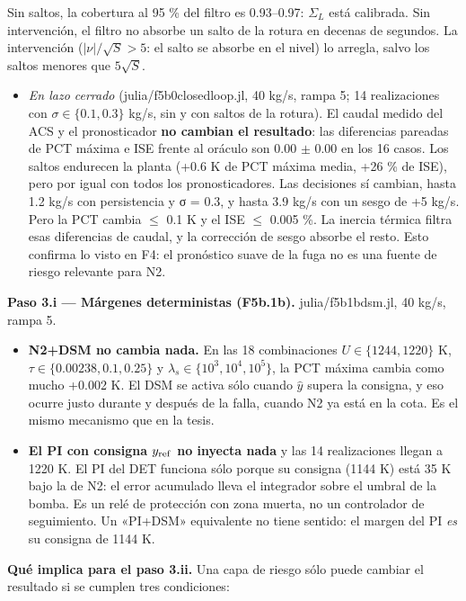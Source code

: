 \documentclass[11pt,a4paper]{article}
\newcommand{\codeus}{\textunderscore\allowbreak}
\newcommand{\code}[1]{{\small\ttfamily\let\_\codeus #1}}
\begin{document}
Sin saltos, la cobertura al 95 \% del filtro es 0.93–0.97: $\Sigma_L$ está calibrada. Sin intervención, el filtro no absorbe un salto de la rotura en decenas de segundos. La intervención ($|\nu|/\sqrt S>5$: el salto se absorbe en el nivel) lo arregla, salvo los saltos menores que $5\sqrt S$.

\begin{itemize}
\item \emph{En lazo cerrado} (\code{julia/f5b0\_closed\_loop.jl}, 40 kg/s, rampa 5; 14 realizaciones con $\sigma\in\{0.1, 0.3\}$ kg/s, sin y con saltos de la rotura). El caudal medido del ACS y el pronosticador \textbf{no cambian el resultado}: las diferencias pareadas de PCT máxima e ISE frente al oráculo son 0.00 $\pm$ 0.00 en los 16 casos. Los saltos endurecen la planta (+0.6 K de PCT máxima media, +26 \% de ISE), pero por igual con todos los pronosticadores. Las decisiones sí cambian, hasta 1.2 kg/s con persistencia y σ = 0.3, y hasta 3.9 kg/s con un sesgo de +5 kg/s. Pero la PCT cambia $\le$ 0.1 K y el ISE $\le$ 0.005 \%. La inercia térmica filtra esas diferencias de caudal, y la corrección de sesgo absorbe el resto. Esto confirma lo visto en F4: el pronóstico suave de la fuga no es una fuente de riesgo relevante para N2.
\end{itemize}

\textbf{Paso 3.i — Márgenes deterministas (F5b.1b).} \code{julia/f5b1b\_dsm.jl}, 40 kg/s, rampa 5.

\begin{itemize}
\item \textbf{N2+DSM no cambia nada.} En las 18 combinaciones $U\in\{1244,1220\}$ K, $\tau\in\{0.00238, 0.1, 0.25\}$ y $\lambda_s\in\{10^3,10^4,10^5\}$, la PCT máxima cambia como mucho +0.002 K. El DSM se activa sólo cuando $\hat y$ supera la consigna, y eso ocurre justo durante y después de la falla, cuando N2 ya está en la cota. Es el mismo mecanismo que en la tesis.
\item \textbf{El PI con consigna $y_{\rm ref}$ no inyecta nada} y las 14 realizaciones llegan a 1220 K. El PI del DET funciona sólo porque su consigna (1144 K) está 35 K bajo la de N2: el error acumulado lleva el integrador sobre el umbral de la bomba. Es un relé de protección con zona muerta, no un controlador de seguimiento. Un «PI+DSM» equivalente no tiene sentido: el margen del PI \emph{es} su consigna de 1144 K.
\end{itemize}

\textbf{Qué implica para el paso 3.ii.} Una capa de riesgo sólo puede cambiar el resultado si se cumplen tres condiciones:
\end{document}
